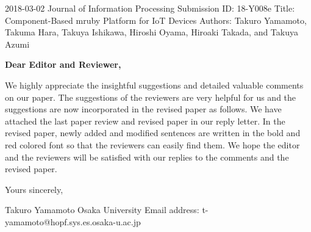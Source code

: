\documentclass{article}
\begin{document}
\begin{flushleft}
  2018-03-02\newline 
  Journal of Information Processing\newline
  Submission ID: 18-Y008e\newline
  Title: Component-Based mruby Platform for IoT Devices\newline
  Authors: Takuro Yamamoto, Takuma Hara, Takuya Ishikawa, Hiroshi Oyama, Hiroaki Takada, and Takuya Azumi\newline
\end{flushleft}

\textbf{Dear Editor and Reviewer,}\newline

We highly appreciate the insightful suggestions and detailed valuable comments on our paper.
The suggestions of the reviewers are very helpful for us and the suggestions are now incorporated in the revised paper as follows.
We have attached the last paper review and revised paper in our reply letter.
In the revised paper, newly added and modified sentences are written in the bold and red colored font so that the reviewers can easily find them.
We hope the editor and the reviewers will be satisfied with our replies to the comments and the revised paper.
\newline\newline

\begin{flushleft}
  Yours sincerely,\newline

  Takuro Yamamoto\newline
  Osaka University\newline
  Email address: t-yamamoto@hopf.sys.es.osaka-u.ac.jp\newline
\end{flushleft}

\clearpage
\end{document}
